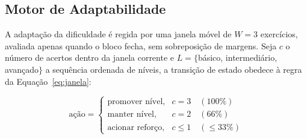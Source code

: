 \documentclass[10pt, a4paper, twocolumn]{article}
\begin{document}
\begin{table}[H]
\centering
\small
\caption{Pilha tecnológica e parâmetros de configuração}
\label{tab:stack}
\vspace{0.13cm}
\end{table}

\subsection{Motor de Adaptabilidade}
\label{subsec:adaptabilidade}

A adaptação da dificuldade é regida por uma janela móvel de $W = 3$ exercícios,
avaliada apenas quando o bloco fecha, sem sobreposição de margens. Seja $c$ o
número de acertos dentro da janela corrente e $L = \{$básico, intermediário,
avançado$\}$ a sequência ordenada de níveis, a transição de estado obedece à
regra da Equação~\ref{eq:janela}:

\begin{equation}
\text{ação} =
\begin{cases}
\text{promover nível,} & c = 3 \quad (100\%) \\
\text{manter nível,}   & c = 2 \quad (66\%) \\
\text{acionar reforço,} & c \leq 1 \quad (\leq 33\%)
\end{cases}
\label{eq:janela}
\end{equation}
\end{document}
